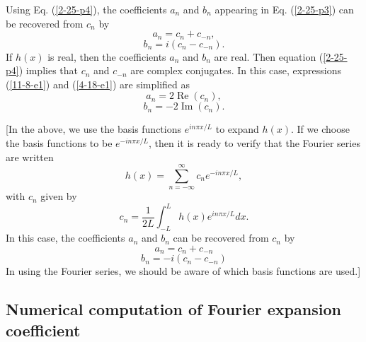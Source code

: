 \documentclass{article}
\newcommand{\tmop}[1]{\ensuremath{\operatorname{#1}}}
\begin{document}
Using Eq. (\ref{2-25-p4}), the coefficients $a_n$ and $b_n$ appearing in Eq.
(\ref{2-25-p3}) can be recovered from $c_n$ by
\begin{equation}
  \label{11-8-e1} a_n = c_n + c_{- n},
\end{equation}
\begin{equation}
  \label{4-18-e1} b_n = i (c_n - c_{- n}) .
\end{equation}
If $h (x)$ is real, then the coefficients $a_n$ and $b_n$ are real. Then
equation (\ref{2-25-p4}) implies that $c_n$ and $c_{- n}$ are complex
conjugates. In this case, expressions (\ref{11-8-e1}) and (\ref{4-18-e1}) are
simplified as
\begin{equation}
  a_n = 2 \tmop{Re} (c_n),
\end{equation}
\begin{equation}
  b_n = - 2 \tmop{Im} (c_n) .
\end{equation}


[In the above, we use the basis functions $e^{i n \pi x / L}$ to expand $h
(x)$. If we choose the basis functions to be $e^{- i n \pi x / L}$, then it is
ready to verify that the Fourier series are written
\begin{equation}
  h (x) = \sum_{n = - \infty}^{\infty} c_n e^{- i n \pi x / L},
\end{equation}
with $c_n$ given by
\begin{equation}
  \label{19-1-10-1} c_n = \frac{1}{2 L} \int_{- L}^L h (x) e^{i n \pi x / L} d
  x.
\end{equation}
In this case, the coefficients $a_n$ and $b_n$ can be recovered from $c_n$ by
\begin{equation}
  \label{18-2-2p1} a_n = c_n + c_{- n}
\end{equation}
\begin{equation}
  \label{18-2-2p2} b_n = - i (c_n - c_{- n})
\end{equation}
In using the Fourier series, we should be aware of which basis functions are
used.]

\subsection{Numerical computation of Fourier expansion coefficient}
\end{document}
